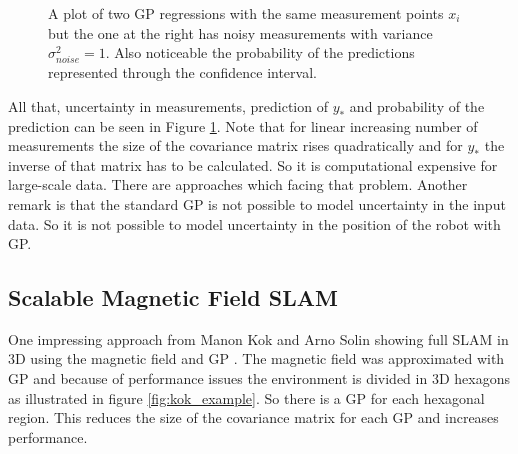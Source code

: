 \begin{figure}[h!]
	\centering
	\captionsetup{justification=centering,margin=1cm}	
	\caption{
		A plot of two GP regressions with the same measurement points $x_i$ but the one at the right has noisy measurements with variance $\sigma_{noise}^2 = 1$. Also noticeable the probability of the predictions represented through the confidence interval.
	}
	\label{fig:gaussian_process_example}
\end{figure}

All that, uncertainty in measurements, prediction of $y_*$ and probability of the prediction can be seen in Figure \ref{fig:gaussian_process_example}. Note that for linear increasing number of measurements the size of the covariance matrix rises quadratically and for $y_*$ the inverse of that matrix has to be calculated. So it is computational expensive for large-scale data. There are approaches which facing that problem. Another remark is that the standard GP is not possible to model uncertainty in the input data. So it is not possible to model uncertainty in the position of the robot with GP. 

\subsection{Scalable Magnetic Field SLAM}
\label{sec:scalable_magnetic_slam}

One impressing approach from Manon Kok and Arno Solin showing full SLAM in 3D using the magnetic field and GP \cite{kok_scalable_2018}. The magnetic field was approximated with GP and because of performance issues the environment is divided in 3D hexagons as illustrated in figure \ref{fig:kok_example}. So there is a GP for each hexagonal region. This reduces the size of the covariance matrix for each GP and increases performance. 

